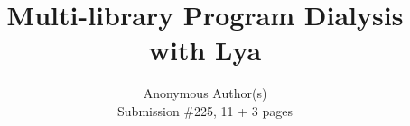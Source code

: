 \documentclass[letterpaper,twocolumn,10pt]{article}
\begin{document}

\date{}

\title{\Large \bf Multi-library Program Dialysis with Lya}

\author{
{\rm Anonymous Author(s)}\\
\normalsize{Submission \#225, 11 + 3 pages}\\
}

\maketitle
\end{document}
